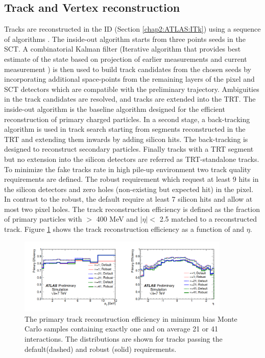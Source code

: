 \subsection{Track and Vertex reconstruction}
\label{chap2:Objects:Trk}
Tracks are reconstructed in the ID (Section \ref{chap2:ATLAS:ITk}) using a sequence of algorithms \cite{Track_Reco, New_Trk}. The inside-out algorithm starts from three points seeds in the SCT.  A combinatorial Kalman filter (Iterative algorithm that provides best estimate of the state based on projection of earlier measurements and current measurement \cite{Kalman} ) is then used to build track candidates from the chosen seeds by incorporating additional space-points from the remaining layers of the pixel and SCT detectors which are compatible with the preliminary trajectory. Ambiguities in the track candidates are resolved, and tracks are extended into the TRT. The inside-out algorithm is the baseline algorithm designed for the efficient reconstruction of primary charged particles. In a second stage, a back-tracking algorithm is used in track search starting from segments reconstructed in the TRT and extending them inwards by adding silicon hits. The back-tracking is designed to reconstruct secondary particles. Finally tracks with a TRT segment but no extension into the silicon detectors are referred as TRT-standalone tracks. To minimize the fake tracks rate in high pile-up environment two track quality requirements are defined. The robust requirement which request at least 9 hits in the silicon detectors and zero holes (non-existing but expected hit) in the pixel. In contrast to the robust, the default require at least 7 silicon hits and allow at most two pixel holes. The track reconstruction efficiency is defined as the fraction of primary particles with \pT $>$ 400 MeV and $|\eta|<$ 2.5 matched to a reconstructed track. Figure \ref{fig:chap2:Objects:Trk:Eff} shows the track reconstruction efficiency as a function of \pT and $\eta$.
\begin{figure}[ht]
    \centering
    \includegraphics[width=0.9\textwidth]{Ch2/Img/Track_reco_eff.png}
    \caption{The primary track reconstruction efficiency in minimum bias Monte Carlo samples containing exactly one and on average 21 or 41 interactions. The distributions are shown for tracks passing the default(dashed) and robust (solid) requirements.}
    \label{fig:chap2:Objects:Trk:Eff}
\end{figure}

